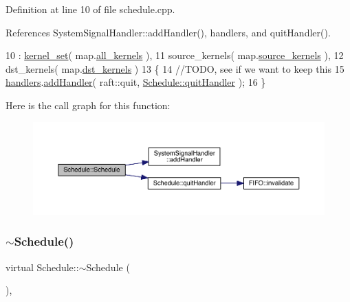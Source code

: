 Definition at line 10 of file schedule.\+cpp.



References System\+Signal\+Handler\+::add\+Handler(), handlers, and quit\+Handler().


\begin{DoxyCode}
10                                  : \hyperlink{class_schedule_a1a448b0d48e656f94db65a70cedd8eed}{kernel\_set}( map.\hyperlink{class_map_base_a2220cd630c5d00708f08d9bc70a48220}{all\_kernels} ),
11                                  source\_kernels( map.\hyperlink{class_map_base_a2541cb37a237e66fc88129f9f0b02f50}{source\_kernels} ),
12                                  dst\_kernels( map.\hyperlink{class_map_base_a83bb7ac6b0e80882356946d19da7ce4a}{dst\_kernels} )
13 \{
14    \textcolor{comment}{//TODO, see if we want to keep this}
15    \hyperlink{class_schedule_ad248e99611a87776fb411836cd46a603}{handlers}.\hyperlink{class_system_signal_handler_a50e022b8b70b7168a20e3ae91c158c70}{addHandler}( raft::quit, \hyperlink{class_schedule_a5167d622689a34ea5f3a065304295521}{Schedule::quitHandler} );
16 \}
\end{DoxyCode}
Here is the call graph for this function\+:
\nopagebreak
\begin{figure}[H]
\begin{center}
\leavevmode
\includegraphics[width=350pt]{class_schedule_ae3fcf18fa8bdbe2ac438962a324cf433_cgraph}
\end{center}
\end{figure}
\hypertarget{class_schedule_a68e52c571576866ef55cb4e891232c58}{}\label{class_schedule_a68e52c571576866ef55cb4e891232c58} 
\subsubsection{\texorpdfstring{$\sim$\+Schedule()}{~Schedule()}}
{\footnotesize\ttfamily virtual Schedule\+::$\sim$\+Schedule (\begin{DoxyParamCaption}{ }\end{DoxyParamCaption})\hspace{0.3cm}{\ttfamily [virtual]}, {\ttfamily [default]}}

